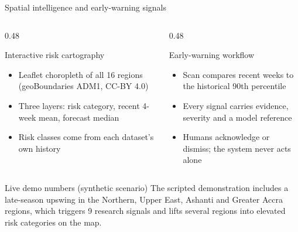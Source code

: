 \documentclass[aspectratio=169,11pt]{beamer}
\begin{document}
\begin{frame}{Spatial intelligence and early-warning signals}
  \begin{columns}[c]
    \begin{column}{0.48\textwidth}
      \begin{block}{Interactive risk cartography}
        \begin{itemize}\small
          \item Leaflet choropleth of all 16 regions (geoBoundaries ADM1, CC-BY 4.0)
          \item Three layers: risk category, recent 4-week mean, forecast median
          \item Risk classes come from each dataset's own history
        \end{itemize}
      \end{block}
    \end{column}
    \begin{column}{0.48\textwidth}
      \begin{alertblock}{Early-warning workflow}
        \begin{itemize}\small
          \item Scan compares recent weeks to the historical 90th percentile
          \item Every signal carries evidence, severity and a model reference
          \item Humans acknowledge or dismiss; the system never acts alone
        \end{itemize}
      \end{alertblock}
    \end{column}
  \end{columns}
  \vspace{2mm}
  \begin{block}{Live demo numbers (synthetic scenario)}
    The scripted demonstration includes a late-season upswing in the Northern,
    Upper East, Ashanti and Greater Accra regions, which triggers 9 research
    signals and lifts several regions into elevated risk categories on the map.
  \end{block}
\end{frame}
\end{document}
